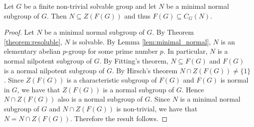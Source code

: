 \begin{theorem}
	\label{theorem:F(G)centraliza}
	Let $G$ be a finite non-trivial solvable group and let $N$ be a minimal normal subgroup of $G$. Then
    $N\subseteq Z(F(G))$ and thus $F(G)\subseteq C_G(N)$.
\end{theorem}

\begin{proof}
	Let $N$ be a minimal normal subgroup of $G$. By Theorem \ref{theorem:resoluble}, $N$ is solvable. 
	By Lemma \ref{lem:minimal_normal}, $N$ is an elementary abelian $p$-group for some prime number $p$.
	In particular, $N$ is a normal nilpotent subgroup of $G$. By Fitting's theorem, $N\subseteq F(G)$ and $F(G)$ is a normal nilpotent subgroup of $G$. By Hirsch's theorem $N\cap Z(F(G))\neq\{ 1\}$. Since $Z(F(G))$ is a characteristic subgroup of $F(G)$ and $F(G)$ is normal in $G$, we have that $Z(F(G))$ is a normal subgroup of $G$.
	Hence $N\cap Z(F(G))$ also is a normal subgroup of $G$.
	Since $N$ is a minimal normal subgroup of $G$ and $N\cap Z(F(G))$ is non-trivial, we have that $N=N\cap Z(F(G))$.
	Therefore the result follows.
\end{proof}







